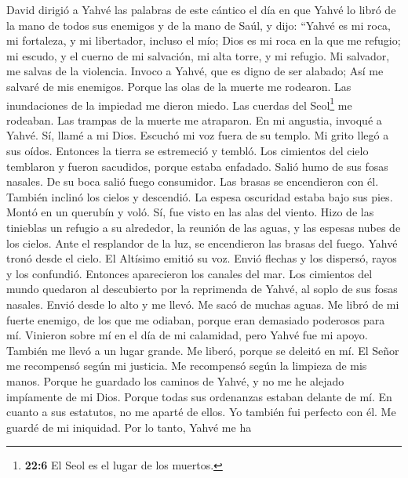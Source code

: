 \begin{paracol}{2}
 David dirigió a Yahvé las palabras de este cántico el día
en que Yahvé lo libró de la mano de todos sus enemigos y de la mano de
Saúl,  y dijo: ``Yahvé es mi roca, mi fortaleza, y mi
libertador, incluso el mío;  Dios es mi roca en la que me
refugio; mi escudo, y el cuerno de mi salvación, mi alta torre, y mi
refugio. Mi salvador, me salvas de la violencia.  Invoco a
Yahvé, que es digno de ser alabado; Así me salvaré de mis enemigos.
 Porque las olas de la muerte me rodearon. Las
inundaciones de la impiedad me dieron miedo.  Las cuerdas
del Seol\footnote{\textbf{22:6} El Seol es el lugar de los muertos.} me
rodeaban. Las trampas de la muerte me atraparon.  En mi
angustia, invoqué a Yahvé. Sí, llamé a mi Dios. Escuchó mi voz fuera de
su templo. Mi grito llegó a sus oídos.  Entonces la tierra
se estremeció y tembló. Los cimientos del cielo temblaron y fueron
sacudidos, porque estaba enfadado.  Salió humo de sus
fosas nasales. De su boca salió fuego consumidor. Las brasas se
encendieron con él.  También inclinó los cielos y
descendió. La espesa oscuridad estaba bajo sus pies. 
Montó en un querubín y voló. Sí, fue visto en las alas del viento.
 Hizo de las tinieblas un refugio a su alrededor, la
reunión de las aguas, y las espesas nubes de los cielos. 
Ante el resplandor de la luz, se encendieron las brasas del fuego.
 Yahvé tronó desde el cielo. El Altísimo emitió su voz.
 Envió flechas y los dispersó, rayos y los confundió.
 Entonces aparecieron los canales del mar. Los cimientos
del mundo quedaron al descubierto por la reprimenda de Yahvé, al soplo
de sus fosas nasales.  Envió desde lo alto y me llevó. Me
sacó de muchas aguas.  Me libró de mi fuerte enemigo, de
los que me odiaban, porque eran demasiado poderosos para mí.
 Vinieron sobre mí en el día de mi calamidad, pero Yahvé
fue mi apoyo.  También me llevó a un lugar grande. Me
liberó, porque se deleitó en mí.  El Señor me recompensó
según mi justicia. Me recompensó según la limpieza de mis manos.
 Porque he guardado los caminos de Yahvé, y no me he
alejado impíamente de mi Dios.  Porque todas sus
ordenanzas estaban delante de mí. En cuanto a sus estatutos, no me
aparté de ellos.  Yo también fui perfecto con él. Me
guardé de mi iniquidad.  Por lo tanto, Yahvé me ha

\end{paracol}
